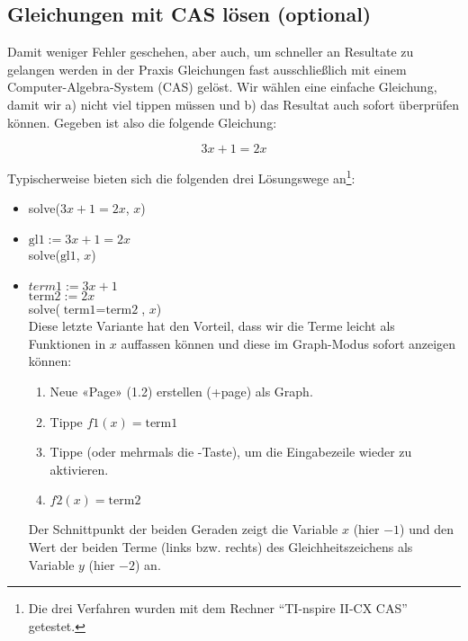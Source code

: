 
\subsection{Gleichungen mit CAS lösen (optional)}
Damit weniger Fehler geschehen, aber auch, um schneller an Resultate zu gelangen werden in der Praxis Gleichungen fast ausschließlich mit einem Computer-Algebra-System (CAS) gelöst.
Wir wählen eine einfache Gleichung, damit wir a) nicht viel tippen müssen und b) das Resultat auch sofort überprüfen können. Gegeben ist also die folgende Gleichung:

$$3x+1=2x$$

Typischerweise bieten sich die folgenden drei Lösungswege an\footnote{Die drei Verfahren wurden mit dem Rechner ``TI-nspire II-CX CAS'' getestet.}:
\begin{itemize}
\item solve($3x+1=2x$, $x$)
\item $\text{gl1} := 3x+1=2x$\\
  solve($\text{gl1}$, $x$)
  
\item $term1 := 3x+1$\\
  $\text{term2} := 2x$\\
  solve($\text{term1}=\text{term2}$, $x$)\\
  Diese letzte Variante hat den Vorteil, dass wir die Terme leicht als Funktionen in $x$ auffassen können und diese im Graph-Modus sofort anzeigen können:
  \begin{enumerate}
    \item Neue «Page» (1.2) erstellen (+page) als Graph. 
    \item Tippe $f1(x)=\text{term1}$
    \item Tippe   (oder mehrmals die -Taste), um die Eingabezeile wieder zu aktivieren.
      \item $f2(x)=\text{term2}$
  \end{enumerate}

  Der Schnittpunkt der beiden Geraden zeigt die Variable $x$ (hier $-1$) und den Wert der beiden Terme (links bzw. rechts) des Gleichheitszeichens als Variable $y$ (hier $-2$) an.

\end{itemize}

\newpage
